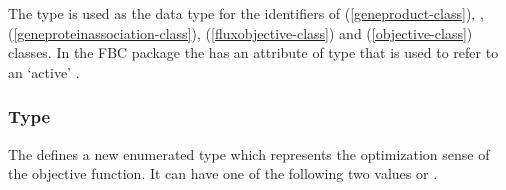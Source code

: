 The  type is used as the data type for the identifiers of
\GeneProduct (\ref{geneproduct-class}),
\bgoli{\GeneProductRef (\ref{geneproductref-class})},
\GeneProteinAssociation (\ref{geneproteinassociation-class}),
\FluxObjective (\ref{fluxobjective-class}) and \Objective (\ref{objective-class})
classes. In the FBC package the
\ListOfObjectives has an attribute of type  that is used to
refer to an `active' \Objective.

%

%

\subsubsection{Type }
\label{primtype-fbctype}

The \FBCPackage defines a new enumerated type  which
represents the optimization sense of the objective function. It can have one
of the following two values  or .

